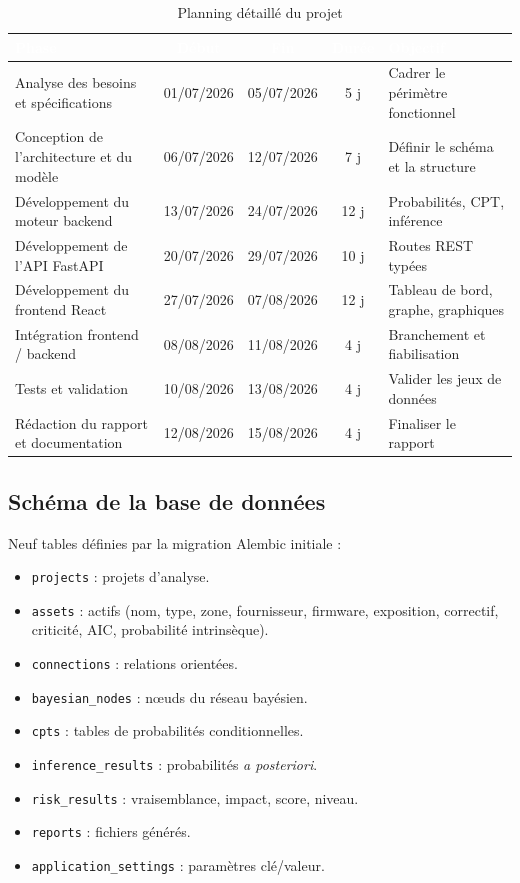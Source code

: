 \documentclass[12pt,a4paper]{article}
\renewcommand{\arraystretch}{1.3}
\newcommand{\forcereset}[1]{}
\begin{document}
\begin{table}[H]
\centering
\caption{Planning détaillé du projet}
\label{tab:planning}
\footnotesize
\setlength{\tabcolsep}{4pt}
\renewcommand{\arraystretch}{1.2}
\begin{tabularx}{\textwidth}{X c c c X}
\toprule
\rowcolor{primary}
\textcolor{white}{\textbf{Phase}} & \textcolor{white}{\textbf{Début}} & \textcolor{white}{\textbf{Fin}} & \textcolor{white}{\textbf{Durée}} & \textcolor{white}{\textbf{Objectif}} \\
\midrule
Analyse des besoins et spécifications & 01/07/2026 & 05/07/2026 & 5 j & Cadrer le périmètre fonctionnel \\
Conception de l'architecture et du modèle & 06/07/2026 & 12/07/2026 & 7 j & Définir le schéma et la structure \\
Développement du moteur backend & 13/07/2026 & 24/07/2026 & 12 j & Probabilités, CPT, inférence \\
Développement de l'API FastAPI & 20/07/2026 & 29/07/2026 & 10 j & Routes REST typées \\
Développement du frontend React & 27/07/2026 & 07/08/2026 & 12 j & Tableau de bord, graphe, graphiques \\
Intégration frontend / backend & 08/08/2026 & 11/08/2026 & 4 j & Branchement et fiabilisation \\
Tests et validation & 10/08/2026 & 13/08/2026 & 4 j & Valider les jeux de données \\
Rédaction du rapport et documentation & 12/08/2026 & 15/08/2026 & 4 j & Finaliser le rapport \\
\bottomrule
\end{tabularx}
\end{table}

\subsection{Schéma de la base de données}
\forcereset{5}

Neuf tables définies par la migration Alembic initiale :

\begin{itemize}[leftmargin=1.2cm, itemsep=0.2\baselineskip]
    \item \texttt{projects} : projets d'analyse.
    \item \texttt{assets} : actifs (nom, type, zone, fournisseur, firmware, exposition, correctif, criticité, AIC, probabilité intrinsèque).
    \item \texttt{connections} : relations orientées.
    \item \texttt{bayesian\_nodes} : nœuds du réseau bayésien.
    \item \texttt{cpts} : tables de probabilités conditionnelles.
    \item \texttt{inference\_results} : probabilités \emph{a posteriori}.
    \item \texttt{risk\_results} : vraisemblance, impact, score, niveau.
    \item \texttt{reports} : fichiers générés.
    \item \texttt{application\_settings} : paramètres clé/valeur.
\end{itemize}
\end{document}
